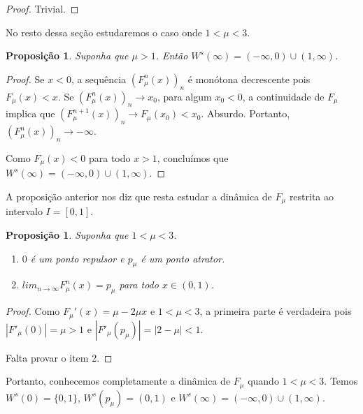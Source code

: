 \documentclass[a4paper, 12pt]{article}
\theoremstyle{definition}
\theoremstyle{plain}
\newtheorem{proposition}[definition]{Proposição}
\theoremstyle{plain}
\theoremstyle{plain}
\theoremstyle{remark}
\begin{document}
\begin{proof}
Trivial.
\end{proof}

No resto dessa seção estudaremos o caso onde $1 < \mu < 3$.

\begin{proposition}
\label{conjunto estavel infinito}
Suponha que $\mu > 1$. Então $W^s(\infty) = (-\infty, 0) \cup (1, \infty)$.
\end{proposition}

\begin{proof}
Se $x < 0$, a sequência  $(F^n _\mu (x))_n$ é monótona decrescente pois  $F_\mu (x) < x$. Se $(F^n_{\mu}(x))_n \rightarrow x_0$, para algum $x_0 < 0$, a continuidade de $F_\mu$ implica que $(F^{n+1}_{\mu}(x))_n \rightarrow F_\mu (x_0) < x_0$. Absurdo. Portanto, $(F^n_{\mu}(x))_n \rightarrow -\infty$.

Como $F_\mu (x) < 0$ para todo $x > 1$, concluímos que $W^s(\infty) = (-\infty, 0) \cup (1, \infty)$.
\end{proof}

A proposição anterior nos diz que resta estudar a dinâmica de $F_\mu$ restrita ao intervalo $I = [0, 1]$.

\begin{proposition}
Suponha que $1 < \mu < 3$.
\begin{enumerate}
\item $0$ é um ponto repulsor e $p_\mu$ é um ponto atrator.
\item $lim_{n \rightarrow \infty} F^n_{\mu}(x) = p_\mu$ para todo $x \in (0, 1)$.
\end{enumerate}
\end{proposition}

\begin{proof}
Como $F_\mu '(x) = \mu - 2\mu x$ e $1 < \mu < 3$, a primeira parte é verdadeira pois $|F'_\mu(0)| = \mu > 1$ e $|F'_\mu (p_\mu)| = |2 - \mu| < 1$.

Falta provar o item 2.
\end{proof}

Portanto, conhecemos completamente a dinâmica de $F_\mu$ quando $1 < \mu < 3$. Temos $W^s(0) = \{0, 1\}$, $W^s(p_\mu) = (0, 1)$ e $W^s(\infty) = (-\infty, 0) \cup (1, \infty)$.
\end{document}

